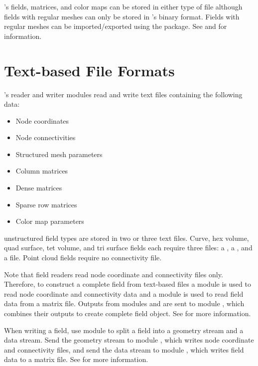 \sr{}'s fields, matrices, and color maps can be stored in either type
of file although fields with regular meshes can only be stored in
\sr{}'s binary format.  Fields with regular meshes can be
imported/exported using the  package.  See
 and
for information.

\section{Text-based File Formats}

\sr{}'s reader and writer modules read and write text files containing the
following data:

\begin{itemize}
\item Node coordinates
\item Node connectivities
\item Structured mesh parameters
\item Column matrices
\item Dense matrices
\item Sparse row matrices
\item Color map parameters
\end{itemize}

\sr{} unstructured field types are stored in two or three text files.
Curve, hex volume, quad surface, tet volume, and tri surface fields
each require three files: a , a
, and a  file.  Point cloud fields require no
connectivity file.  

Note that field readers read node coordinate and connectivity files
only.  Therefore, to construct a complete field from text-based files
a  module is used to read node coordinate and
connectivity data and a  module is used to read
field data from a matrix file.  Outputs from modules
 and  are sent to module
, which combines their outputs to create
complete field object.  See 
for more information.

When writing a field, use module  to split a
field into a geometry stream and a data stream.  Send the geometry
stream to module , which writes node coordinate
and connectivity files, and send the data stream to module
, which writes field data to a matrix file.  See
 for more information.

